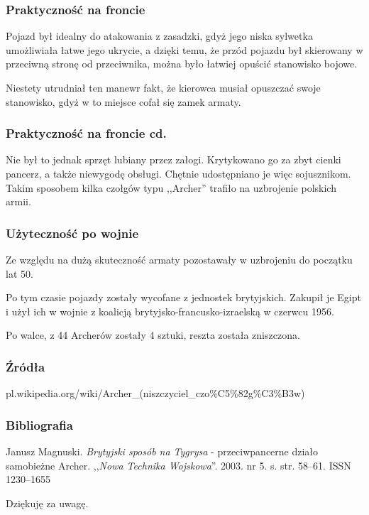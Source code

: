 \documentclass[]{beamer}
\begin{document}
\begin{frame}
\frametitle{Praktyczność na froncie}
\cite{Tank}Pojazd był idealny do atakowania z zasadzki, gdyż jego niska sylwetka umożliwiała łatwe jego ukrycie, a dzięki temu, że przód pojazdu był skierowany w przeciwną stronę od przeciwnika, można było łatwiej opuścić stanowisko bojowe.

Niestety utrudniał ten manewr fakt, że kierowca musiał opuszczać swoje stanowisko, gdyż w to miejsce cofał się zamek armaty.
\end{frame}

\begin{frame}
\frametitle[toc=]{Praktyczność na froncie cd.}
Nie był to jednak sprzęt lubiany przez załogi. Krytykowano go za zbyt cienki pancerz, a także niewygodę obsługi. Chętnie udostępniano je więc sojusznikom. Takim sposobem kilka czołgów typu ,,Archer'' trafiło na uzbrojenie polskich armii.
\end{frame}

\begin{frame}
\frametitle{Użyteczność po wojnie}
Ze względu na dużą skuteczność armaty pozostawały w uzbrojeniu do początku lat 50. \pause 

Po tym czasie pojazdy zostały wycofane z jednostek brytyjskich. Zakupił je Egipt i użył ich w wojnie z koalicją brytyjsko-francusko-izraelską w czerwcu 1956. \pause

Po walce, z 44 Archerów zostały 4 sztuki, reszta została zniszczona.
\end{frame}

\begin{frame}
\frametitle{Źródła}
pl.wikipedia.org/wiki/Archer\_(niszczyciel\_czo\%C5\%82g\%C3\%B3w)
\end{frame}
\begin{frame}
\frametitle{Bibliografia}
\begin{thebibliography}{9}
 Janusz Magnuski. \textit{Brytyjski sposób na Tygrysa} - przeciwpancerne działo samobieżne Archer. ,,\textit{Nowa Technika Wojskowa}''. 2003. nr 5. s. str. 58--61. ISSN 1230--1655
\end{thebibliography}
\end{frame}
\begin{frame}
\begin{center}
Dziękuję za uwagę.
\end{center}
\end{frame}
\end{document}
